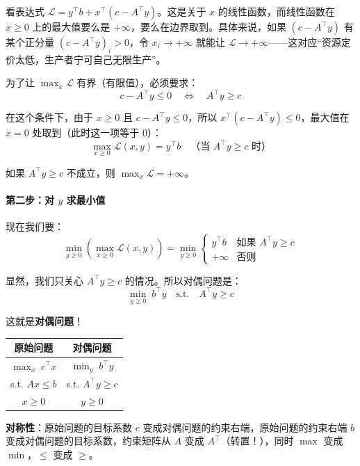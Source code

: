 看表达式 $\mathcal{L} = y^\top b + x^\top(c - A^\top y)$。这是关于 $x$ 的线性函数，而线性函数在 $x \geq 0$ 上的最大值要么是 $+\infty$，要么在边界取到。具体来说，如果 $(c - A^\top y)$ 有某个正分量 $(c - A^\top y)_i > 0$，令 $x_i \to +\infty$ 就能让 $\mathcal{L} \to +\infty$——这对应“资源定价太低，生产者宁可自己无限生产”。

为了让 $\max_x \mathcal{L}$ 有界（有限值），必须要求：
\[
c - A^\top y \leq 0 \quad \Leftrightarrow \quad A^\top y \geq c
\]

在这个条件下，由于 $x \geq 0$ 且 $c - A^\top y \leq 0$，所以 $x^\top(c - A^\top y) \leq 0$，最大值在 $x = 0$ 处取到（此时这一项等于 0）：
\[
\max_{x \geq 0} \mathcal{L}(x, y) = y^\top b \quad \text{（当 $A^\top y \geq c$ 时）}
\]

如果 $A^\top y \geq c$ 不成立，则 $\max_x \mathcal{L} = +\infty$。

\paragraph{第二步：对 $y$ 求最小值}

现在我们要：
\[
\min_{y \geq 0} \left( \max_{x \geq 0} \mathcal{L}(x, y) \right) = \min_{y \geq 0} \begin{cases} y^\top b & \text{如果 } A^\top y \geq c \\ +\infty & \text{否则} \end{cases}
\]

显然，我们只关心 $A^\top y \geq c$ 的情况。所以对偶问题是：
\[
\min_{y \geq 0} \; b^\top y \quad \text{s.t.} \quad A^\top y \geq c
\]

这就是\textbf{对偶问题}！

\begin{keyformula}[title=线性规划的原始-对偶对]
\begin{center}
\renewcommand{\arraystretch}{1.5}
\begin{tabular}{c|c}
\textbf{原始问题} & \textbf{对偶问题} \\
\hline
$\displaystyle\max_x \; c^\top x$ & $\displaystyle\min_y \; b^\top y$ \\
s.t. $Ax \leq b$ & s.t. $A^\top y \geq c$ \\
$x \geq 0$ & $y \geq 0$ \\
\end{tabular}
\end{center}

\vspace{0.3cm}
\textbf{对称性}：原始问题的目标系数 $c$ 变成对偶问题的约束右端，原始问题的约束右端 $b$ 变成对偶问题的目标系数，约束矩阵从 $A$ 变成 $A^\top$（转置！），同时 $\max$ 变成 $\min$，$\leq$ 变成 $\geq$。
\end{keyformula}

